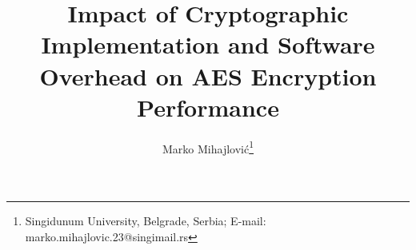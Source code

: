\title{Impact of Cryptographic Implementation and Software Overhead on AES Encryption Performance}
\author{Marko Mihajlovi\'c\thanks{Singidunum University, Belgrade, Serbia; E-mail: marko.mihajlovic.23@singimail.rs}}
\date{}
